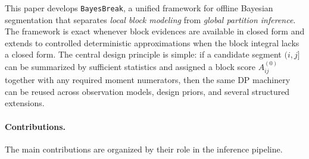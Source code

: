 This paper develops \texttt{BayesBreak}, a unified framework for offline Bayesian segmentation
that separates \emph{local block modeling} from \emph{global partition inference}. The framework is
exact whenever block evidences are available in closed form and extends to controlled deterministic
approximations when the block integral lacks a closed form. The central design principle is simple: if a
candidate segment $(i,j]$ can be summarized by sufficient statistics and assigned a block score
$A^{(0)}_{ij}$ together with any required moment numerators, then the same DP machinery can be
reused across observation models, design priors, and several structured extensions.

\paragraph{Contributions.}
The main contributions are organized by their role in the inference pipeline.
